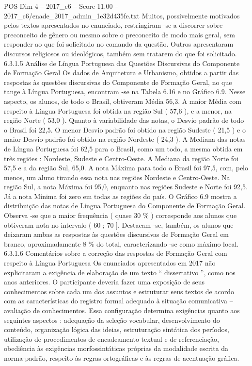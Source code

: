 \begin{textsample}{POS Dim 4 – 2017\_c6 – Score 11.00 – 2017\_c6/enade\_2017\_admin\_1e32d435fe.txt}
Muitos, possivelmente motivados pelos textos apresentados no enunciado, restringiram -se a discorrer sobre preconceito de gênero ou mesmo sobre o preconceito de modo mais geral, sem responder ao que foi solicitado no comando da questão.
Outros apresentaram discursos religiosos ou ideológicos, também sem tratarem do que foi solicitado. 6.3.1.5 Análise de Língua Portuguesa das Questões Discursivas do Componente de Formação Geral Os dados de Arquitetura e Urbanismo, obtidos a partir das respostas às questões discursivas do Componente de Formação Geral, no que tange à Língua Portuguesa, encontram -se na Tabela 6.16 e no Gráfico 6.9.
Nesse aspecto, os alunos, de todo o Brasil, obtiveram Média 56,3.
A maior Média com respeito à Língua Portuguesa foi obtida na região Sul ( 57,6 ), e a menor, na região Norte ( 53,0 ).
Quanto à variabilidade das notas, o Desvio padrão de todo o Brasil foi 22,5.
O menor Desvio padrão foi obtido na região Sudeste ( 21,5 ) e o maior Desvio padrão foi obtido na região Nordeste ( 24,3 ).
A Mediana das notas de Língua Portuguesa foi 62,5 para o Brasil, como um todo, a mesma obtida em três regiões : Nordeste, Sudeste e Centro-Oeste.
A Mediana da região Norte foi 57,5 e a da região Sul, 65,0.
A nota Máxima para todo o Brasil foi 97,5, com, pelo menos, um aluno tirando essa nota nas regiões Nordeste e Centro-Oeste.
Na região Sul, a nota Máxima foi 95,0, enquanto nas regiões Sudeste e Norte foi 92,5.
Já a nota Mínima foi zero em todas as regiões do país.
O Gráfico 6.9 mostra a distribuição das notas de Língua Portuguesa do Componente de Formação Geral.
Observa -se que a maior frequência ( quase 30 \% ) corresponde aos alunos que obtiveram nota no intervalo ( 60 ; 70 ].
Destacam -se, também, os alunos que deixaram ambas as respostas às questões discursivas de Formação Geral em branco, aproximadamente 8 \% do total, caracterizando -se como máximo local. 6.3.1.6 Comentários sobre a correção das respostas de Formação Geral com respeito à Língua Portuguesa Os enunciados apresentados em 2017 não explicitaram a exigência de elaboração de um texto “ dissertativo ”, como nos anos anteriores.
O participante deveria fazer uma exposição de seus conhecimentos sobre cada um dos assuntos e estruturar seus textos de acordo com as características do registro formal adequado à situação comunicativa – avaliação de conhecimentos.
Essa configuração determina exigências quanto aos seguintes aspectos : adequação da seleção vocabular, desenvolvimento do conteúdo, organização lógica das ideias, estruturação sintática dos períodos, utilização de procedimentos de encadeamento textual e de referenciação, obediência às exigências morfossintáticas próprias da modalidade escrita da norma-padrão, respeito às regras ortográficas e às regras de acentuação gráfica.

\end{textsample}
